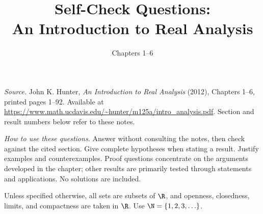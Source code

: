 \documentclass{self-check}
\title{Self-Check Questions:\\An Introduction to Real Analysis}
\subtitle{Chapters 1--6}
\author{}
\date{}
\begin{document}
\maketitle

\textit{Source.} John K. Hunter, \textit{An Introduction to Real Analysis}
(2012), Chapters 1--6, printed pages 1--92. Available at
\url{https://www.math.ucdavis.edu/~hunter/m125a/intro_analysis.pdf}.
Section and result numbers below refer to these notes.

\textit{How to use these questions.} Answer without consulting the notes,
then check against the cited section. Give complete hypotheses when stating
a result. Justify examples and counterexamples. Proof questions concentrate
on the arguments developed in the chapter; other results are primarily
tested through statements and applications. No solutions are included.

Unless specified otherwise, all sets are subsets of \(\R\), and openness,
closedness, limits, and compactness are taken in \(\R\).
Use \(\N=\{1,2,3,\ldots\}\).

\tableofcontents
\clearpage


\clearpage

\clearpage

\clearpage

\clearpage

\clearpage

\end{document}
